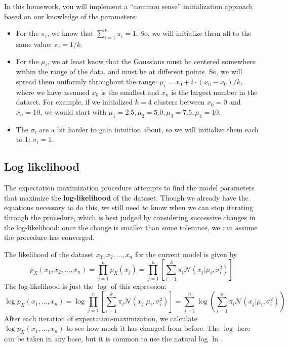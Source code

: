\documentclass[10pt]{article}
\begin{document}
In this homework, you will implement a ``common sense'' initialization approach based on our knowledge of the parameters:
\begin{itemize}
\item For the $\pi_i$, we know that $\sum_{i=1}^{k} \pi_i = 1$. So, we will initialize them all to the same value: $\pi_i = 1 / k$.

\item For the $\mu_i$, we at least know that the Gaussians must be centered somewhere within the range of the data, and must be at different points. So, we will spread them uniformly throughout the range: $\mu_i = x_0 + i \cdot (x_n - x_0) / k$, where we have assumed $x_0$ is the smallest and $x_n$ is the largest number in the dataset. For example, if we initialized $k = 4$ clusters between $x_0 = 0$ and $x_n = 10$, we would start with $\mu_1 = 2.5, \mu_2 = 5.0, \mu_3 = 7.5, \mu_4 = 10$.

\item The $\sigma_i$ are a bit harder to gain intuition about, so we will initialize them each to $1$: $\sigma_i = 1$.
\end{itemize}


\subsection{Log likelihood}
The expectation maximization procedure attempts to find the model parameters that maximize the \textbf{log-likelihood} of the dataset. Though we already have the equations necessary to do this, we still need to know when we can stop iterating through the procedure, which is best judged by considering successive changes in the log-likelihood: once the change is smaller than some tolerance, we can assume the procedure has converged.

The likelihood of the dataset $x_1, x_2, ..., x_n$ for the current model is given by
$$p_X(x_1, x_2, ..., x_n) = \prod_{j=1}^{n} p_X(x_j) = \prod_{j=1}^{n} \left[ \sum_{i=1}^{k} \pi_i \mathcal{N} (x_j | \mu_i, \sigma_i^2) \right]$$
The log-likelihood is just the $\log$ of this expression:
$$\log p_X(x_1, ..., x_n) = \log \prod_{j=1}^{n} \left[ \sum_{i=1}^{k} \pi_i \mathcal{N} (x_j | \mu_i, \sigma_i^2) \right] = \sum_{j=1}^{n} \log \left( \sum_{i=1}^{k} \pi_i \mathcal{N} (x_j | \mu_i, \sigma_i^2) \right)$$
After each iteration of expectation-maximization, we calculate $\log p_X(x_1, ..., x_n)$ to see how much it has changed from before. The $\log$ here can be taken in any base, but it is common to use the natural log $\ln$.
\end{document}
